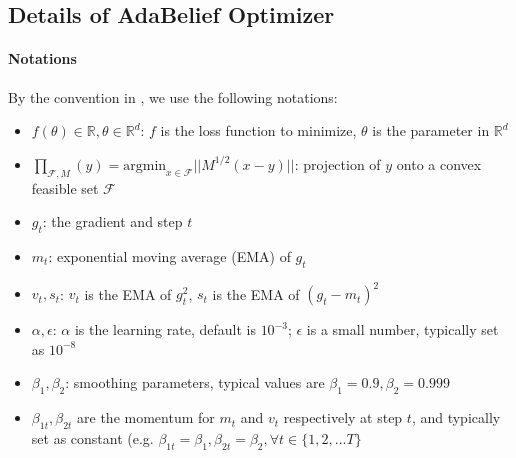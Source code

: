 \documentclass{article}
\begin{document}
\subsection{Details of AdaBelief Optimizer}
\label{subsec:detail}
\paragraph{Notations} By the convention in \cite{kingma2014adam}, we use the following notations:
\begin{itemize}[topsep=0pt,parsep=0pt,partopsep=0pt]
    \item $f(\theta) \in \mathbb{R}, \theta \in \mathbb{R}^d$: $f$ is the loss function to minimize, $\theta$ is the parameter in $\mathbb{R}^d$
    \item  $\prod_{\mathcal{F},M}(y) = \mathrm{argmin}_{x \in \mathcal{F}} \vert \vert M^{1/2} (x-y) \vert \vert$:
    projection of $y$ onto a convex feasible set $\mathcal{F}$
    \item $g_t$: the gradient and step $t$
    \item $m_t$: exponential moving average (EMA) of $g_t$
    \item $v_t, s_t$: $v_t$ is the EMA of $g_t^2$, $s_t$ is the EMA of $(g_t - m_t)^2$
    \item $\alpha, \epsilon$: $\alpha$ is the learning rate, default is $10^{-3}$; $\epsilon$ is a small number, typically set as $10^{-8}$
    \item $\beta_1, \beta_2$: smoothing parameters, typical values are $\beta_1=0.9, \beta_2=0.999$
    \item $\beta_{1t},\beta_{2t}$ are the momentum for $m_t$ and $v_t$ respectively at step $t$, and typically set as constant (e.g. $\beta_{1t}=\beta_1, \beta_{2t} = \beta_2, \forall t \in \{1,2,...T\}$
\end{itemize}
\end{document}
